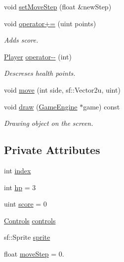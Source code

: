 \begin{DoxyCompactItemize}
\item 
void \mbox{\hyperlink{class_player_a658ca673f68b8ba14f888b313f2f8fd3}{set\+Move\+Step}} (float \&new\+Step)
\item 
void \mbox{\hyperlink{class_player_a234802f1731a329b697fde399a20d0ad}{operator+=}} (uint points)
\begin{DoxyCompactList}\small\item\em Adds score. \end{DoxyCompactList}\item 
\mbox{\hyperlink{class_player}{Player}} \mbox{\hyperlink{class_player_ac56de355f4f7079ddc994ea16f05cda2}{operator-\/-\/}} (int)
\begin{DoxyCompactList}\small\item\em Descreses health points. \end{DoxyCompactList}\item 
void \mbox{\hyperlink{class_player_aef0d42bebee03ea367cc38d07d614536}{move}} (int side, sf\+::\+Vector2u, uint)
\item 
void \mbox{\hyperlink{class_player_aaa0642fde01a4db5e9ee95693805ecda}{draw}} (\mbox{\hyperlink{class_game_engine}{Game\+Engine}} $\ast$game) const
\begin{DoxyCompactList}\small\item\em Drawing object on the screen. \end{DoxyCompactList}\end{DoxyCompactItemize}
\subsection*{Private Attributes}
\begin{DoxyCompactItemize}
\item 
int \mbox{\hyperlink{class_player_a1d1f9fee5f774351292af1d0cfa7d65c}{index}}
\item 
int \mbox{\hyperlink{class_player_a2baad6b9a274417a7374baf11d5f723d}{hp}} = 3
\item 
uint \mbox{\hyperlink{class_player_ab8b3c0ffbde70b09f2ad4d230478f33b}{score}} = 0
\item 
\mbox{\hyperlink{struct_controls}{Controls}} \mbox{\hyperlink{class_player_a13625a09fdc72185e82ff5f6894049af}{controls}}
\item 
sf\+::\+Sprite \mbox{\hyperlink{class_player_a19bc8731e5e84613a2ae7c4b5134dfab}{sprite}}
\item 
float \mbox{\hyperlink{class_player_aca3b0c23e14b372078c31cdb7906032c}{move\+Step}} = 0.
\end{DoxyCompactItemize}


